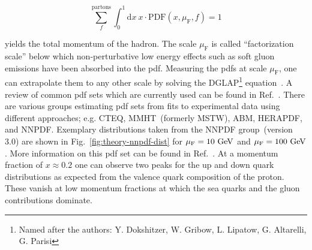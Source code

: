 \begin{equation}
\sum_{f}^\mathrm{partons}\int_{0}^{1}\mathrm{d}x~x\cdot \mathrm{PDF}(x,\mu_\mathrm{F},f)=1
\end{equation}

yields the total momentum of the hadron. The scale $\mu_\mathrm{F}$ is called ``factorization scale'' below which non-perturbative low energy effects such as soft gluon emissions have been absorbed into the \gls{pdf}. Measuring the \glspl{pdf} at scale $\mu_\mathrm{F}$, one can extrapolate them to any other scale by solving the DGLAP\footnote{Named after the authors: Y. Dokshitzer, W. Gribow, L. Lipatow, G. Altarelli, G. Parisi} equation~\cite{Dokshitzer:1977sg,Gribov:1972ri,Altarelli:1977zs}. A review of common \gls{pdf} sets which are currently used can be found in Ref.~\cite{Accardi2016}. There are various groups estimating \gls{pdf} sets from fits to experimental data using different approaches; e.g. CTEQ, MMHT~(formerly MSTW), ABM, HERAPDF, and NNPDF. Exemplary distributions taken from the NNPDF group~(version 3.0) are shown in Fig.~\ref{fig:theory-nnpdf-dist} for $\mu_\mathrm{F}=10~\mathrm{GeV}$ and $\mu_\mathrm{F}=100~\mathrm{GeV}$. More information on this \gls{pdf} set can be found in Ref.~\cite{Ball:2014uwa}. At a momentum fraction of $x\approx0.2$ one can observe two peaks for the up and down quark distributions as expected from the valence quark composition of the proton. These vanish at low momentum fractions at which the sea quarks and the gluon contributions dominate.


